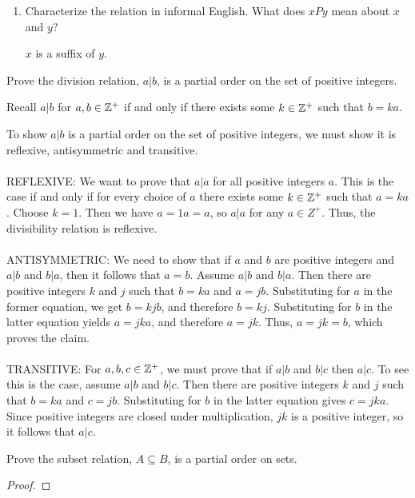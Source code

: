 \documentclass[]{exam}
\begin{document}
\begin{questions}
\begin{enumerate}[label=\alph*)]
\item Characterize the relation in informal English. What does $xPy$ mean about $x$
and $y$?\\
\begin{solution}
$x$ is a suffix of $y$.
\end{solution}

\end{enumerate}
\question Prove the division relation, $a | b$, is a partial order on the set
of positive integers. 
\begin{solution}
Recall $a|b$ for $a,b \in \mathbb{Z}^+$ if and only if there exists 
some $k \in \mathbb{Z}^+$ such that $b = ka$.

To show $a | b$ is a partial order on the set of positive integers, we must
show it is reflexive, antisymmetric and transitive.
\\~\\
REFLEXIVE:  We want to prove that $a | a$ for all positive integers $a$. This
is the case if and only if for every choice of $a$ there exists some $k \in
\mathbb{Z}^+$ such that $a = ka$. Choose $k = 1$. Then we have $a = 1a = a$, so $a | a$
for any $a \in Z^+$. Thus, the divisibility relation is reflexive.
\\~\\
ANTISYMMETRIC: We need to show that if $a$ and $b$ are positive integers and 
$a | b$ and $b | a$, then it follows that $a = b$. Assume $a | b$ and $b | a$.
Then there are positive integers $k$ and $j$ such that $b = ka$ and $a = jb$.
Substituting for $a$ in the former equation, we get $b = kjb$, and 
therefore $b = kj$. Substituting for $b$ in the latter equation yields $a =
jka$, and therefore $a = jk$. Thus, $a = jk = b$, which proves the claim.
\\~\\
TRANSITIVE: For $a,b,c \in \mathbb{Z}^+$, we must prove that if $a | b$ and $b | c$
then $a | c$. To see this is the case, assume $a | b$ and $b | c$. Then there
are positive integers $k$ and $j$ such that $b = ka$ and $c = jb$. Substituting
for $b$ in the latter equation gives $c = jka$. Since positive integers are
closed under multiplication, $jk$ is a positive integer, so it follows that
$a | c$.
\end{solution}

\question Prove the subset relation, $A \subseteq B$, is a partial order on
sets. 
\begin{solution}
\begin{proof}


\end{proof}
\end{solution}
\end{questions}
\end{document}
